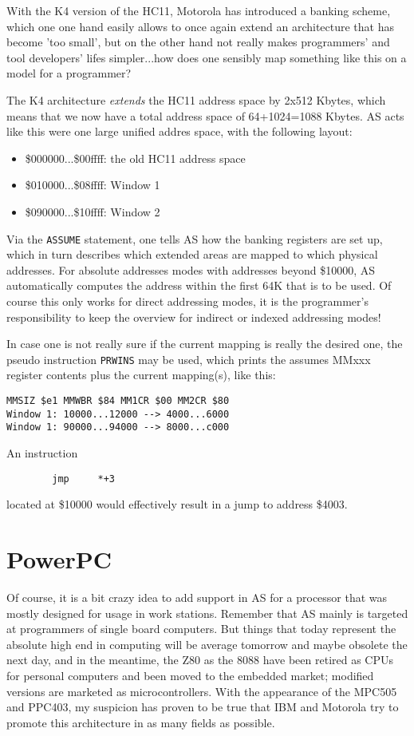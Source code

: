 \documentclass[12pt,twoside]{report}
\begin{document}
With the K4 version  of the HC11, Motorola has introduced a banking
scheme, which one one hand easily allows to once again extend an
architecture that has become 'too small', but on the other hand not really
makes programmers' and tool developers' lifes simpler...how does one
sensibly map something like this on a model for a programmer?

The K4 architecture {\em extends} the HC11 address space by 2x512 Kbytes,
which means that we now have a total address space of 64+1024=1088 Kbytes.
AS acts like this were one large unified addres space, with the following
layout:
\begin{itemize}
\item{\$000000...\$00ffff: the old HC11 address space}
\item{\$010000...\$08ffff: Window 1}
\item{\$090000...\$10ffff: Window 2}
\end{itemize}
Via the {\tt ASSUME} statement, one tells AS how the banking registers are
set up, which in turn describes which extended areas are mapped to which
physical addresses.  For absolute addresses modes with addresses beyond
\$10000, AS automatically computes the address within the first 64K that
is to be used.  Of course this only works for direct addressing modes, it
is the programmer's responsibility to keep the overview for indirect or
indexed addressing modes!

In case one is not really sure if the current mapping is really the
desired one, the pseudo instruction {\tt PRWINS} may be used, which prints
the assumes MMxxx register contents plus the current mapping(s), like
this:
\begin{verbatim}
MMSIZ $e1 MMWBR $84 MM1CR $00 MM2CR $80
Window 1: 10000...12000 --> 4000...6000
Window 1: 90000...94000 --> 8000...c000
\end{verbatim}
An instruction
\begin{verbatim}
        jmp     *+3
\end{verbatim}
located at \$10000 would effectively result in a jump to address \$4003.


\section{PowerPC}

Of course, it is a bit crazy idea to add support in AS for a
processor that was mostly designed for usage in work stations.
Remember that AS mainly is targeted at programmers of single board
computers.  But things that today represent the absolute high end in
computing will be average tomorrow and maybe obsolete the next day,
and in the meantime, the Z80 as the 8088 have been retired as CPUs
for personal computers and been moved to the embedded market;
modified versions are marketed as microcontrollers.  With the
appearance of the MPC505 and PPC403, my suspicion has proven to be
true that IBM and Motorola try to promote this architecture in as
many fields as possible.
\end{document}
